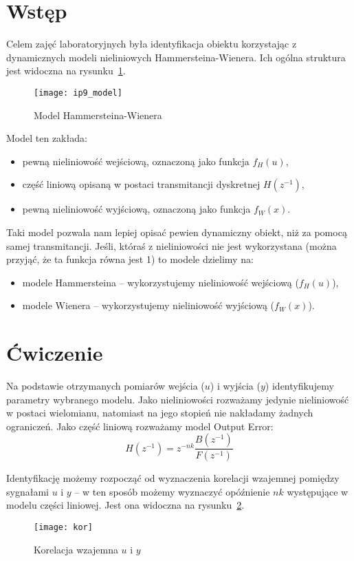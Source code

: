 \documentclass[11pt, a4paper]{article}
\begin{document}
\section{Wstęp}

Celem zajęć laboratoryjnych była identyfikacja obiektu korzystając z dynamicznych modeli nieliniowych Hammersteina-Wienera. Ich ogólna struktura jest widoczna na rysunku~\ref{fig:modele}.
\begin{figure}[htbp!]
	\centering
	\texttt{[image: ip9\_model]}
	\caption{Model Hammersteina-Wienera}
	\label{fig:modele}
\end{figure}

Model ten zakłada:
\begin{itemize}
\item pewną nieliniowość wejściową, oznaczoną jako funkcja $f_H(u)$,
\item część liniową opisaną w postaci transmitancji dyskretnej $H(z^{-1})$,
\item pewną nieliniowość wyjściową, oznaczoną jako funkcja $f_W(x)$.
\end{itemize}

Taki model pozwala nam lepiej opisać pewien dynamiczny obiekt, niż za pomocą samej transmitancji. Jeśli, któraś z nieliniowości nie jest wykorzystana (można przyjąć, że ta funkcja równa jest 1) to modele dzielimy na:
\begin{itemize}
\item modele Hammersteina -- wykorzystujemy nieliniowość wejściową ($f_H(u)$),
\item modele Wienera -- wykorzystujemy nieliniowość wyjściową ($f_W(x)$).
\end{itemize}

\section{Ćwiczenie}

Na podstawie otrzymanych pomiarów wejścia ($u$) i wyjścia ($y$) identyfikujemy parametry wybranego modelu. Jako nieliniowości rozważamy jedynie nieliniowość w postaci wielomianu, natomiast na jego stopień nie nakładamy żadnych ograniczeń. Jako część liniową rozważamy model Output Error:
\[
	H(z^{-1}) = z^{-nk} \frac{B(z^{-1})}{F(z^{-1})}
\]

Identyfikację możemy rozpocząć od wyznaczenia korelacji wzajemnej pomiędzy sygnałami $u$ i $y$ -- w ten sposób możemy wyznaczyć opóźnienie $nk$ występujące w modelu części liniowej. Jest ona widoczna na rysunku~\ref{fig:korelacja}.
\begin{figure}[htbp!]
	\centering
	\texttt{[image: kor]}
	\caption{Korelacja wzajemna $u$ i $y$}
	\label{fig:korelacja}
\end{figure}
\end{document}
